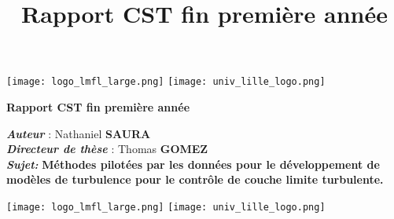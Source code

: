 \documentclass[a4paper,12pt]{article}
\title{\navy \textbf{Rapport CST fin première année} \color{black}}%
\date{}
\newcommand\bk{\color{black}}
\newcommand\brick{\color{brick}}
\newcommand\navy{\color{navy}}
\numberwithin{equation}{section} %
\begin{document}
	\begin{titlepage} \centering
		\begin{minipage}[ht]{0.7\textwidth}
			\centering
			\texttt{[image: logo\_lmfl\_large.png]} \hfill
			\texttt{[image: univ\_lille\_logo.png]}
		\end{minipage}

		\vspace*{\fill}
		\Huge\textbf{Rapport CST fin première année}  \normalsize \\
		\vspace{1.4cm}		
		
		\begin{center}
			\large \brick \textbf{\textit{Auteur}} :  \bk \large Nathaniel \textbf{\textsc{SAURA}}\\[3mm]

			\large \brick \textbf{\textit{Directeur de thèse}} :  \bk \large Thomas \textbf{\textsc{GOMEZ}}\\[1cm]
			
			\large \textit{\navy \textbf{Sujet:} \bk} \large \textbf{Méthodes pilotées par les données pour le développement de modèles de turbulence pour le contrôle de couche limite turbulente.}
			\end{center}
			
		\vspace*{\fill}
	\begin{minipage}[ht]{0.7\textwidth}
			\centering
			\texttt{[image: logo\_lmfl\_large.png]} \hfill
			\texttt{[image: univ\_lille\_logo.png]}
		\end{minipage}
		
\end{titlepage}

\newpage
\end{document}
